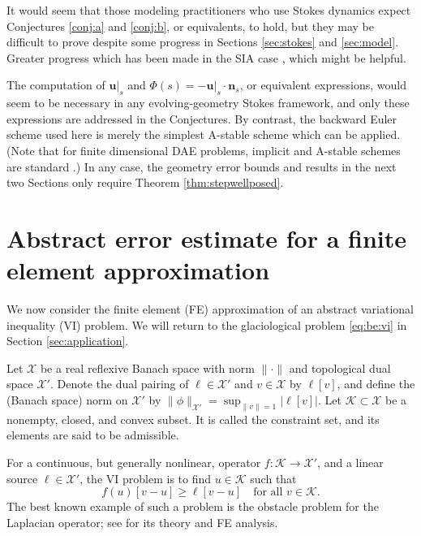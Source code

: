 \documentclass[hidelinks,onefignum,onetabnum,final]{siamart220329}  %
\newcommand{\bn}{\mathbf{n}}
\newcommand{\bu}{\mathbf{u}}
\newcommand{\cK}{\mathcal{K}}
\newcommand{\cX}{\mathcal{X}}
\begin{document}
It would seem that those modeling practitioners who use Stokes dynamics expect Conjectures \ref{conj:a} and \ref{conj:b}, or equivalents, to hold, but they may be difficult to prove despite some progress in Sections \ref{sec:stokes} and \ref{sec:model}.  Greater progress which has been made in the SIA case \cite{Calvoetal2003,JouvetBueler2012,PiersantiTemam2023}, which might be helpful.

The computation of $\bu|_s$ and $\Phi(s)=-\bu|_s\cdot \bn_s$, or equivalent expressions, would seem to be necessary in any evolving-geometry Stokes framework, and only these expressions are addressed in the Conjectures.  By contrast, the backward Euler scheme used here is merely the simplest A-stable \cite{AscherPetzold1998} scheme which can be applied.  (Note that for finite dimensional DAE problems, implicit and A-stable schemes are standard \cite{AscherPetzold1998}.)  In any case, the geometry error bounds and results in the next two Sections only require Theorem \ref{thm:stepwellposed}.


\section{Abstract error estimate for a finite element approximation} \label{sec:abstractestimate}

We now consider the finite element (FE) approximation of an abstract variational inequality (VI) problem.  We will return to the glaciological problem \eqref{eq:be:vi} in Section \ref{sec:application}.

Let $\cX$ be a real reflexive Banach space with norm $\|\cdot\|$ and topological dual space $\cX'$.  Denote the dual pairing of $\ell \in \cX'$ and $v\in\cX$ by $\ell[v]$, and define the (Banach space) norm on $\cX'$ by $\|\phi\|_{\cX'} = \sup_{\|v\|=1} \big|\ell[v]\big|$.  Let $\cK \subset \cX$ be a nonempty, closed, and convex subset.  It is called the constraint set, and its elements are said to be admissible.

For a continuous, but generally nonlinear, operator $f:\cK \to \cX'$, and a linear source $\ell\in \cX'$, the VI problem is to find $u\in \cK$ such that
\begin{equation}
f(u)[v-u] \ge \ell[v-u] \quad \text{for all } v\in \cK. \label{eq:vi}
\end{equation}
The best known example of such a problem is the obstacle problem for the Laplacian operator; see \cite{Ciarlet2002,Evans2010,KinderlehrerStampacchia1980} for its theory and FE analysis.
\end{document}

